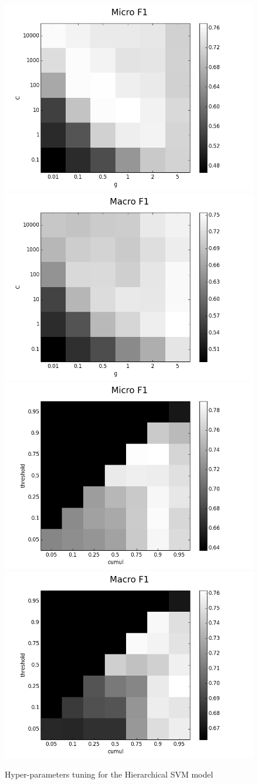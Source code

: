 \documentclass[12pt]{article}
\begin{document}
\begin{figure}[!ht]
    \centering
    \includegraphics[width=0.5\linewidth]{Figures/Tuning_Figures/instanceClassification_kernel_tuning_Micro_F1.png}\hfill
    \includegraphics[width=0.5\linewidth]{Figures/Tuning_Figures/instanceClassification_kernel_tuning_Macro_F1.png}\vfill
    \includegraphics[width=0.5\linewidth]{Figures/Tuning_Figures/instanceClassification_threshold_tuning_Micro_F1.png}\hfill
    \includegraphics[width=0.5\linewidth]{Figures/Tuning_Figures/instanceClassification_threshold_tuning_Macro_F1.png}
    \caption{\label{hierarchicalKernelTuning} Hyper-parameters tuning for the Hierarchical SVM model}
\end{figure}
\end{document}
